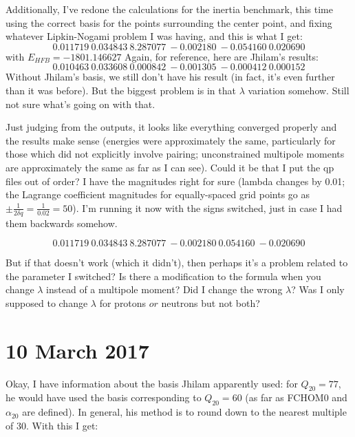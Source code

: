 \documentclass[]{report}
\begin{document}
Additionally, I've redone the calculations for the inertia benchmark, this time using the correct basis for the points surrounding the center point, and fixing whatever Lipkin-Nogami problem I was having, and this is what I get:
\begin{equation}
    0.011719\    0.034843\    8.287077\   -0.002180\   -0.054160\    0.020690
\end{equation}
\noindent with $E_{HFB}=-1801.146627$ Again, for reference, here are Jhilam's results:
\begin{equation}
   0.010463\    0.033608\    0.000842\   -0.001305\   -0.000412\    0.000152
\end{equation}
Without Jhilam's basis, we still don't have his result (in fact, it's even further than it was before). But the biggest problem is in that $\lambda$ variation somehow. Still not sure what's going on with that.

Just judging from the outputs, it looks like everything converged properly and the results make sense (energies were approximately the same, particularly for those which did not explicitly involve pairing; unconstrained multipole moments are approximately the same as far as I can see). Could it be that I put the qp files out of order? I have the magnitudes right for sure (lambda changes by 0.01; the Lagrange coefficient magnitudes for equally-spaced grid points go as $\pm\frac{1}{2\delta q} = \frac{1}{0.02}=50$). I'm running it now with the signs switched, just in case I had them backwards somehow. 

\begin{equation}
    0.011719\    0.034843\    8.287077\   -0.002180\    0.054160\   -0.020690
\end{equation}

\noindent But if that doesn't work (which it didn't), then perhaps it's a problem related to the parameter I switched? Is there a modification to the formula when you change $\lambda$ instead of a multipole moment? Did I change the wrong $\lambda$? Was I only supposed to change $\lambda$ for protons $\mathit{or}$ neutrons but not both?

\section*{10 March 2017}
Okay, I have information about the basis Jhilam apparently used: for $Q_{20}=77$, he would have used the basis corresponding to $Q_{20}=60$ (as far as FCHOM0 and $\alpha_{20}$ are defined). In general, his method is to round down to the nearest multiple of 30. With this I get:
\end{document}
